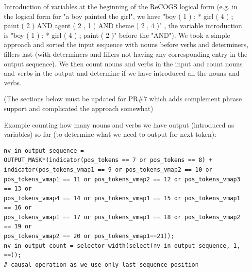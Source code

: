 \documentclass[11pt]{article}
\begin{document}
Introduction of variables at the beginning of the ReCOGS logical form (e.g. in the logical form for "a boy painted the girl", we have "boy ( 1 ) ; * girl ( 4 ) ; paint ( 2 ) AND agent ( 2 , 1 ) AND theme ( 2 , 4 )" , the variable introduction is "boy ( 1 ) ; * girl ( 4 ) ; paint ( 2 )" before the "AND"). We took a simple approach and sorted the input sequence with nouns before verbs and determiners, fillers last (with determiners and fillers not having any corresponding entry in the output sequence). We then count nouns and verbs in the input and count nouns and verbs in the output and determine if we have introduced all the nouns and verbs.

(The sections below must be updated for PR\#7 which adds complement phrase support and complicated the approach somewhat) 

Example counting how many nouns and verbs we have output (introduced as variables) so far (to determine what we need to output for next token):
\begin{tiny}
\begin{verbatim}
nv_in_output_sequence = 
OUTPUT_MASK*(indicator(pos_tokens == 7 or pos_tokens == 8) + 
indicator(pos_tokens_vmap1 == 9 or pos_tokens_vmap2 == 10 or 
pos_tokens_vmap1 == 11 or pos_tokens_vmap2 == 12 or pos_tokens_vmap3 == 13 or 
pos_tokens_vmap4 == 14 or pos_tokens_vmap1 == 15 or pos_tokens_vmap1 == 16 or 
pos_tokens_vmap1 == 17 or pos_tokens_vmap1 == 18 or pos_tokens_vmap2 == 19 or 
pos_tokens_vmap2 == 20 or pos_tokens_vmap1==21));
nv_in_output_count = selector_width(select(nv_in_output_sequence, 1, ==)); 
# causal operation as we use only last sequence position
\end{verbatim}
\end{tiny}
\end{document}
